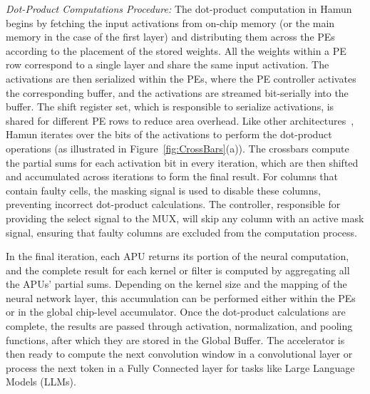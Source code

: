 \emph{Dot-Product Computations Procedure:} The dot-product computation in Hamun begins by fetching the input activations from on-chip memory (or the main memory in the case of the first layer) and distributing them across the PEs according to the placement of the stored weights. All the weights within a PE row correspond to a single layer and share the same input activation. The activations are then serialized within the PEs, where the PE controller activates the corresponding buffer, and the activations are streamed bit-serially into the buffer. The shift register set, which is responsible to serialize activations, is shared for different PE rows to reduce area overhead. Like other architectures~\cite{ISAAC, PRIME, ReDy}, Hamun iterates over the bits of the activations to perform the dot-product operations (as illustrated in Figure~\ref{fig:CrossBars}(a)). The crossbars compute the partial sums for each activation bit in every iteration, which are then shifted and accumulated across iterations to form the final result. For columns that contain faulty cells, the masking signal is used to disable these columns, preventing incorrect dot-product calculations. The controller, responsible for providing the select signal to the MUX, will skip any column with an active mask signal, ensuring that faulty columns are excluded from the computation process.

In the final iteration, each APU returns its portion of the neural computation, and the complete result for each kernel or filter is computed by aggregating all the APUs' partial sums. Depending on the kernel size and the mapping of the neural network layer, this accumulation can be performed either within the PEs or in the global chip-level accumulator. Once the dot-product calculations are complete, the results are passed through activation, normalization, and pooling functions, after which they are stored in the Global Buffer. The accelerator is then ready to compute the next convolution window in a convolutional layer or process the next token in a Fully Connected layer for tasks like Large Language Models (LLMs).
